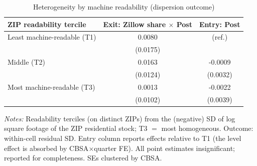 \begin{table}[!htbp]\centering
\caption{Heterogeneity by machine readability (dispersion outcome)}
\label{tab:T4}
\begin{tabular}{lcc}
\toprule
ZIP readability tercile & Exit: Zillow share $\times$ Post & Entry: Post\\
\midrule
Least machine-readable (T1) & 0.0080 & (ref.)\\
 & (0.0175) & \\[2pt]
Middle (T2) & 0.0163 & -0.0009\\
 & (0.0124) & (0.0032)\\[2pt]
Most machine-readable (T3) & 0.0013 & -0.0022\\
 & (0.0102) & (0.0039)\\[2pt]
\bottomrule
\end{tabular}
\begin{minipage}{0.9\linewidth}\footnotesize\vspace{2pt}
\emph{Notes:} Readability terciles (on distinct ZIPs) from the (negative)
SD of log square footage of the ZIP residential stock; T3 $=$ most
homogeneous. Outcome: within-cell residual SD. Entry column reports effects
relative to T1 (the level effect is absorbed by CBSA$\times$quarter FE).
All point estimates insignificant; reported for completeness. SEs clustered
by CBSA.
\end{minipage}
\end{table}
